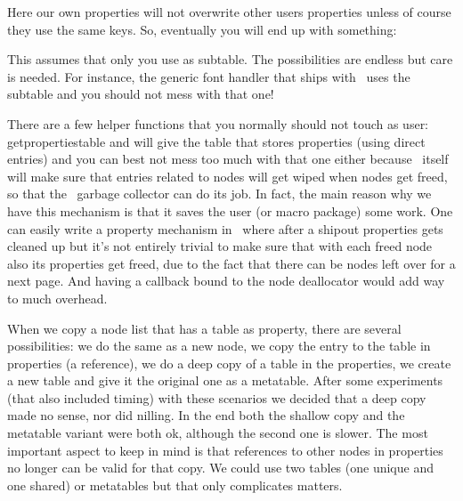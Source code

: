 Here our own properties will not overwrite other users properties unless of
course they use the same keys. So, eventually you will end up with something:

\starttyping
{}
\stoptyping

This assumes that only you use  as subtable. The possibilities are
endless but care is needed. For instance, the generic font handler that ships
with \CONTEXT\ uses the  subtable and you should not mess with
that one!

There are a few helper functions that you normally should not touch as user: \typ
{getpropertiestable} and will give the table that stores properties (using
direct entries) and you can best not mess too much with that one either because
\LUAMETATEX\ itself will make sure that entries related to nodes will get wiped when
nodes get freed, so that the \LUA\ garbage collector can do its job. In fact, the
main reason why we have this mechanism is that it saves the user (or macro
package) some work. One can easily write a property mechanism in \LUA\ where
after a shipout properties gets cleaned up but it's not entirely trivial to make
sure that with each freed node also its properties get freed, due to the fact
that there can be nodes left over for a next page. And having a callback bound to
the node deallocator would add way to much overhead.

When we copy a node list that has a table as property, there are several
possibilities: we do the same as a new node, we copy the entry to the table in
properties (a reference), we do a deep copy of a table in the properties, we
create a new table and give it the original one as a metatable. After some
experiments (that also included timing) with these scenarios we decided that a
deep copy made no sense, nor did nilling. In the end both the shallow copy and
the metatable variant were both ok, although the second one is slower. The most
important aspect to keep in mind is that references to other nodes in properties
no longer can be valid for that copy. We could use two tables (one unique and one
shared) or metatables but that only complicates matters.

